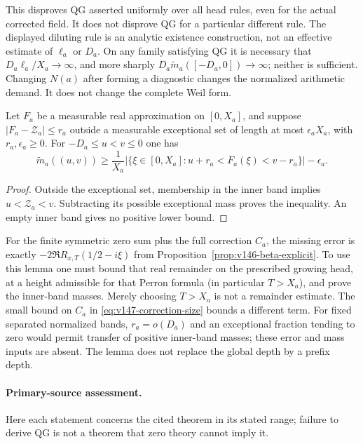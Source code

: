 This disproves QG asserted uniformly over all head rules, even for
the actual corrected field. It does not disprove QG for a particular
different rule. The displayed diluting rule is an analytic existence
construction, not an effective estimate of $\ell_a$ or $D_a$.
On any family satisfying QG it is necessary that
$D_a\ell_a/X_a\to\infty$, and more sharply
$D_a\widetilde m_a([-D_a,0])\to\infty$; neither is sufficient.
Changing $N(a)$ after forming a diagnostic changes the normalized
arithmetic demand. It does not change the complete Weil form.

\begin{lemma}
\label{ns40-lem-prefix}
Let $F_a$ be a measurable real approximation on $[0,X_a]$, and
suppose $|F_a-\mathcal Z_a|\le r_a$ outside a measurable exceptional
set of length at most $\epsilon_aX_a$, with $r_a,\epsilon_a\ge0$.
For $-D_a\le u<v\le0$ one has
\begin{equation}\label{ns40-eq-prefix-band}
 \widetilde m_a((u,v))\ge
 \frac1{X_a}|\{\xi\in[0,X_a]:u+r_a<F_a(\xi)<v-r_a\}|
 -\epsilon_a.
\end{equation}
\end{lemma}
\begin{proof}
Outside the exceptional set, membership in the inner band implies
$u<\mathcal Z_a<v$. Subtracting its possible exceptional mass proves
the inequality. An empty inner band gives no positive lower bound.
\end{proof}
For the finite symmetric zero sum plus the full correction $C_a$,
the missing error is exactly $-2\Re R_{x,T}(1/2-i\xi)$ from
Proposition~\ref{prop:v146-beta-explicit}. To use this lemma one
must bound that real remainder on the prescribed growing head,
at a height admissible for that Perron formula (in particular $T>X_a$),
and prove the inner-band masses. Merely choosing $T>X_a$ is not a
remainder estimate. The small bound on $C_a$ in
\eqref{eq:v147-correction-size} bounds a different term.
For fixed separated normalized bands, $r_a=o(D_a)$ and an
exceptional fraction tending to zero would permit transfer of
positive inner-band masses; these error and mass inputs are absent.
The lemma does not replace the global depth by a prefix depth.

\paragraph{Primary-source assessment.}
Here each statement concerns the cited theorem in its stated range;
failure to derive QG is not a theorem that zero theory cannot imply it.

